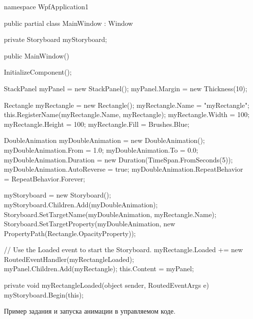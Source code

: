 \begin{listing}[H]
\begin{csharpcode}
namespace WpfApplication1
{
    public partial class MainWindow : Window
    {
        private Storyboard myStoryboard;

        public MainWindow()
        {
            InitializeComponent();

            StackPanel myPanel = new StackPanel();
            myPanel.Margin = new Thickness(10);

            Rectangle myRectangle = new Rectangle();
            myRectangle.Name = "myRectangle";
            this.RegisterName(myRectangle.Name, myRectangle);
            myRectangle.Width = 100;
            myRectangle.Height = 100;
            myRectangle.Fill = Brushes.Blue;

            DoubleAnimation myDoubleAnimation = new DoubleAnimation();
            myDoubleAnimation.From = 1.0;
            myDoubleAnimation.To = 0.0;
            myDoubleAnimation.Duration = new Duration(TimeSpan.FromSeconds(5));
            myDoubleAnimation.AutoReverse = true;
            myDoubleAnimation.RepeatBehavior = RepeatBehavior.Forever;

            myStoryboard = new Storyboard();
            myStoryboard.Children.Add(myDoubleAnimation);
            Storyboard.SetTargetName(myDoubleAnimation, myRectangle.Name);
            Storyboard.SetTargetProperty(myDoubleAnimation, new PropertyPath(Rectangle.OpacityProperty));

            // Use the Loaded event to start the Storyboard.
            myRectangle.Loaded += new RoutedEventHandler(myRectangleLoaded);
            myPanel.Children.Add(myRectangle);
            this.Content = myPanel;
        }

        private void myRectangleLoaded(object sender, RoutedEventArgs e)
        {
            myStoryboard.Begin(this);
        }
    }
}
\end{csharpcode}
\caption{Пример задания и запуска анимации в управляемом коде.}
\label{lst:animations_in_code}
\end{listing}